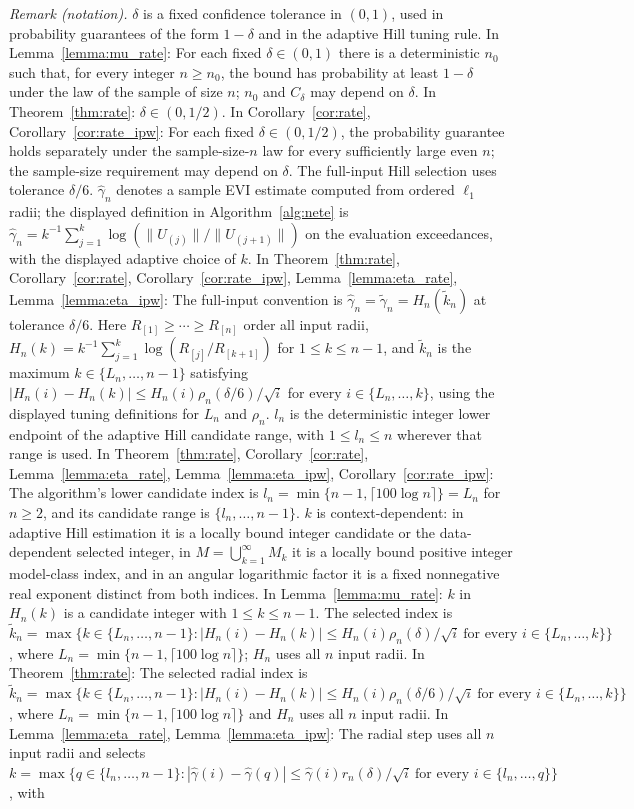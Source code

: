 \documentclass[12pt]{article}
\theoremstyle{plain}
\theoremstyle{definition}
\begin{document}
\noindent\textit{Remark (notation).} $\delta$ is a fixed confidence tolerance in $(0,1)$, used in probability guarantees of the form $1-\delta$ and in the adaptive Hill tuning rule. In Lemma~\ref{lemma:mu_rate}: For each fixed $\delta\in(0,1)$ there is a deterministic $n_0$ such that, for every integer $n\geq n_0$, the bound has probability at least $1-\delta$ under the law of the sample of size $n$; $n_0$ and $C_\delta$ may depend on $\delta$. In Theorem~\ref{thm:rate}: $\delta\in(0,1/2)$. In Corollary~\ref{cor:rate}, Corollary~\ref{cor:rate_ipw}: For each fixed $\delta\in(0,1/2)$, the probability guarantee holds separately under the sample-size-$n$ law for every sufficiently large even $n$; the sample-size requirement may depend on $\delta$. The full-input Hill selection uses tolerance $\delta/6$. $\hat\gamma_n$ denotes a sample EVI estimate computed from ordered $\ell_1$ radii; the displayed definition in Algorithm~\ref{alg:nete} is $\hat\gamma_n=k^{-1}\sum_{j=1}^k\log(\|U_{(j)}\|/\|U_{(j+1)}\|)$ on the evaluation exceedances, with the displayed adaptive choice of $k$. In Theorem~\ref{thm:rate}, Corollary~\ref{cor:rate}, Corollary~\ref{cor:rate_ipw}, Lemma~\ref{lemma:eta_rate}, Lemma~\ref{lemma:eta_ipw}: The full-input convention is $\hat\gamma_n=\widetilde\gamma_n=H_n(\widetilde k_n)$ at tolerance $\delta/6$. Here $R_{[1]}\geq\cdots\geq R_{[n]}$ order all input radii, $H_n(k)=k^{-1}\sum_{j=1}^k\log(R_{[j]}/R_{[k+1]})$ for $1\leq k\leq n-1$, and $\widetilde k_n$ is the maximum $k\in\{L_n,\ldots,n-1\}$ satisfying $|H_n(i)-H_n(k)|\leq H_n(i)\rho_n(\delta/6)/\sqrt i$ for every $i\in\{L_n,\ldots,k\}$, using the displayed tuning definitions for $L_n$ and $\rho_n$. $l_n$ is the deterministic integer lower endpoint of the adaptive Hill candidate range, with $1\leq l_n\leq n$ wherever that range is used. In Theorem~\ref{thm:rate}, Corollary~\ref{cor:rate}, Lemma~\ref{lemma:eta_rate}, Lemma~\ref{lemma:eta_ipw}, Corollary~\ref{cor:rate_ipw}: The algorithm's lower candidate index is $l_n=\min\{n-1,\lceil100\log n\rceil\}=L_n$ for $n\geq2$, and its candidate range is $\{l_n,\ldots,n-1\}$. $k$ is context-dependent: in adaptive Hill estimation it is a locally bound integer candidate or the data-dependent selected integer, in $M=\bigcup_{k=1}^{\infty}M_k$ it is a locally bound positive integer model-class index, and in an angular logarithmic factor it is a fixed nonnegative real exponent distinct from both indices. In Lemma~\ref{lemma:mu_rate}: $k$ in $H_n(k)$ is a candidate integer with $1\leq k\leq n-1$. The selected index is $\widetilde k_n=\max\{k\in\{L_n,\ldots,n-1\}:|H_n(i)-H_n(k)|\leq H_n(i)\rho_n(\delta)/\sqrt i\ \text{for every }i\in\{L_n,\ldots,k\}\}$, where $L_n=\min\{n-1,\lceil100\log n\rceil\}$; $H_n$ uses all $n$ input radii. In Theorem~\ref{thm:rate}: The selected radial index is $\widetilde k_n=\max\{k\in\{L_n,\ldots,n-1\}:|H_n(i)-H_n(k)|\leq H_n(i)\rho_n(\delta/6)/\sqrt i\ \text{for every }i\in\{L_n,\ldots,k\}\}$, where $L_n=\min\{n-1,\lceil100\log n\rceil\}$ and $H_n$ uses all $n$ input radii. In Lemma~\ref{lemma:eta_rate}, Lemma~\ref{lemma:eta_ipw}: The radial step uses all $n$ input radii and selects $k=\max\{q\in\{l_n,\ldots,n-1\}:|\hat\gamma(i)-\hat\gamma(q)|\leq\hat\gamma(i)r_n(\delta)/\sqrt i\ \text{for every }i\in\{l_n,\ldots,q\}\}$, with 
\end{document}
